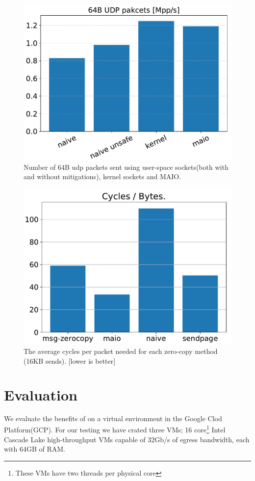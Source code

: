 \begin{figure}[t]
    \centering
    \includegraphics[width=\columnwidth]{syscall.pdf}
    \caption{Number of 64B udp packets sent using user-space sockets(both with and without mitigations), kernel sockets and MAIO.} 
    \label{fig:pps}
\end{figure}
\begin{figure}[t]
    \centering
    \includegraphics[width=\columnwidth]{send.pdf}
    \caption{The average cycles per packet needed for each zero-copy method (16KB sends). [lower is better]}
    \label{fig:tx_compare}
\end{figure}
\section{Evaluation}
We evaluate the benefits of \oursys on a virtual environment in the Google Clod Platform(GCP).
For our testing we have crated three VMs; 16 core\footnote{These VMs have two threads per physical core} Intel Cascade Lake high-throughput VMs capable of 32Gb/s of egress bandwidth\cite{gcp}, each with 64GB of RAM.

